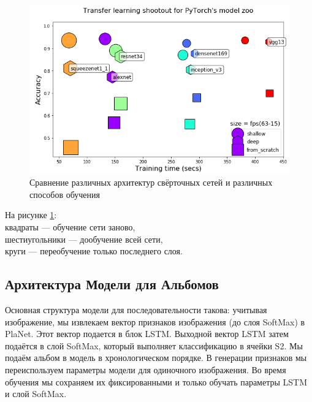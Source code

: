 \begin{figure}[h]
	\centering
	\includegraphics[width=0.7\linewidth]{img/comp}
	\caption{Сравнение различных архитектур свёрточных сетей и различных способов обучения}
	\label{fig:comp}
\end{figure}
На рисунке \ref{fig:comp}:\\
квадраты --- обучение сети заново,\\
шестиугольники --- дообучение всей сети,\\
круги --- переобучение только последнего слоя.


\subsection{Архитектура Модели для Альбомов}
Основная структура модели для последовательности такова:
учитывая изображение, мы извлекаем вектор признаков изображения (до слоя SoftMax) в PlaNet. Этот вектор подается в блок LSTM. Выходной вектор LSTM затем подаётся в слой SoftMax, который выполняет классификацию в ячейки S2. Мы подаём альбом в модель в хронологическом порядке. В генерации признаков мы переиспользуем параметры модели для одиночного изображения. Во время обучения мы сохраняем их фиксированными и только обучать параметры LSTM и слой SoftMax.

